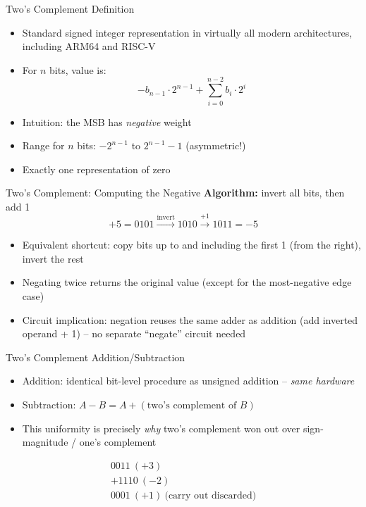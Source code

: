 \documentclass[10pt, aspectratio=169]{beamer}
\begin{document}
\begin{frame}{Two's Complement Definition}
\begin{itemize}
    \item Standard signed integer representation in virtually all modern architectures, including ARM64 and RISC-V
    \item For $n$ bits, value is:
    \[
    -b_{n-1}\cdot 2^{n-1} + \sum_{i=0}^{n-2} b_i \cdot 2^i
    \]
    \item Intuition: the MSB has \emph{negative} weight
    \item Range for $n$ bits: $-2^{n-1}$ to $2^{n-1}-1$ (asymmetric!)
    \item Exactly one representation of zero
\end{itemize}
\end{frame}

\begin{frame}{Two's Complement: Computing the Negative}
\textbf{Algorithm:} invert all bits, then add 1
\[
+5 = 0101 \xrightarrow{\text{invert}} 1010 \xrightarrow{+1} 1011 = -5
\]
\begin{itemize}
    \item Equivalent shortcut: copy bits up to and including the first 1 (from the right), invert the rest
    \item Negating twice returns the original value (except for the most-negative edge case)
    \item Circuit implication: negation reuses the same adder as addition (add inverted operand + 1) -- no separate ``negate'' circuit needed
\end{itemize}
\end{frame}

\begin{frame}{Two's Complement Addition/Subtraction}
\begin{itemize}
    \item Addition: identical bit-level procedure as unsigned addition -- \emph{same hardware}
    \item Subtraction: $A - B = A + (\text{two's complement of } B)$
    \item This uniformity is precisely \emph{why} two's complement won out over sign-magnitude / one's complement
\end{itemize}
\[
\begin{array}{r}
 0011\ (+3) \\
+1110\ (-2) \\
\hline
 0001\ (+1)\ \text{(carry out discarded)}
\end{array}
\]
\end{frame}
\end{document}
